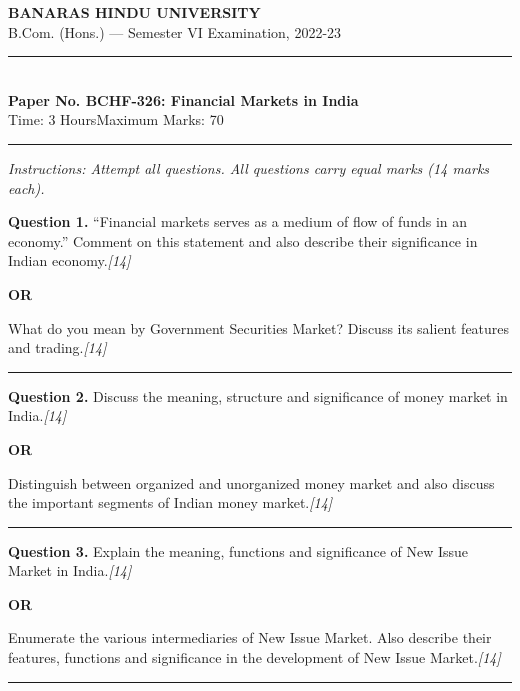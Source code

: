\documentclass[11pt,a4paper]{article}
\newcommand{\pts}[1]{\hfill   \textit{[#1]}}
\begin{document}
\begin{center}
  {\large\bfseries BANARAS HINDU UNIVERSITY}\\[2pt]
  {\normalsize B.Com. (Hons.) --- Semester VI Examination, 2022-23}\\[6pt]
  \rule{0.8\linewidth}{0.5pt}\\[6pt]
  {\large\bfseries Paper No. BCHF-326: Financial Markets in India}\\[4pt]
  {\normalsize Time: 3 Hours\hfill Maximum Marks: 70}
\end{center}

\rule{\linewidth}{0.4pt}

\smallskip



\noindent   \textit{Instructions: Attempt all questions. All questions carry equal marks (14 marks each).}

\bigskip




\noindent   \textbf{Question 1.}
``Financial markets serves as a medium of flow of funds in an economy.'' Comment on this statement and also describe their significance in Indian economy.\pts{14}

\centerline{   \textbf{OR}}

What do you mean by Government Securities Market? Discuss its salient features and trading.\pts{14}

\medskip\rule{\linewidth}{0.2pt}




\noindent   \textbf{Question 2.}
Discuss the meaning, structure and significance of money market in India.\pts{14}

\centerline{   \textbf{OR}}

Distinguish between organized and unorganized money market and also discuss the important segments of Indian money market.\pts{14}

\medskip\rule{\linewidth}{0.2pt}




\noindent   \textbf{Question 3.}
Explain the meaning, functions and significance of New Issue Market in India.\pts{14}

\centerline{   \textbf{OR}}

Enumerate the various intermediaries of New Issue Market. Also describe their features, functions and significance in the development of New Issue Market.\pts{14}

\medskip\rule{\linewidth}{0.2pt}
\end{document}
